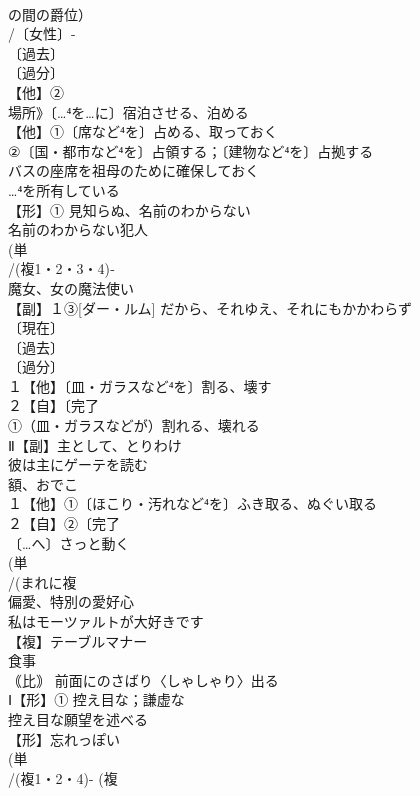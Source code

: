 \documentclass[8pt]{extreport}
\begin{document}
\begin{CJK}{UTF8}{min}
\\	の間の爵位）
\\	/〔女性〕-
\\	〔過去〕
\\	〔過分〕
\\	【他】②
\\	場所》〔…⁴を…に〕宿泊させる、泊める
\\	【他】①〔席など⁴を〕占める、取っておく 
\\	②〔国・都市など⁴を〕占領する；〔建物など⁴を〕占拠する 
\\	バスの座席を祖母のために確保しておく 
\\	…⁴を所有している
\\	【形】① 見知らぬ、名前のわからない 
\\	名前のわからない犯人
\\	(単
\\	/(複1・2・3・4)‐
\\	魔女、女の魔法使い 
\\	【副】１③[ダー・ルム] だから、それゆえ、それにもかかわらず
\\	〔現在〕
\\	〔過去〕
\\	〔過分〕
\\	１【他】〔皿・ガラスなど⁴を〕割る、壊す 
\\	２【自】〔完了
\\	①（皿・ガラスなどが）割れる、壊れる
\\	Ⅱ【副】主として、とりわけ 
\\	彼は主にゲーテを読む
\\	額、おでこ 
\\	１【他】①〔ほこり・汚れなど⁴を〕ふき取る、ぬぐい取る 
\\	２【自】②〔完了
\\	〔…へ〕さっと動く
\\	(単
\\	/(まれに複
\\	偏愛、特別の愛好心 
\\	私はモーツァルトが大好きです
\\	【複】テーブルマナー 
\\	食事 
\\	｟比｠ 前面にのさばり〈しゃしゃり〉出る
\\	Ⅰ【形】① 控え目な；謙虚な 
\\	控え目な願望を述べる
\\	【形】忘れっぽい 
\\	(単
\\	/(複1・2・4)- (複

\end{CJK}
\end{document}
